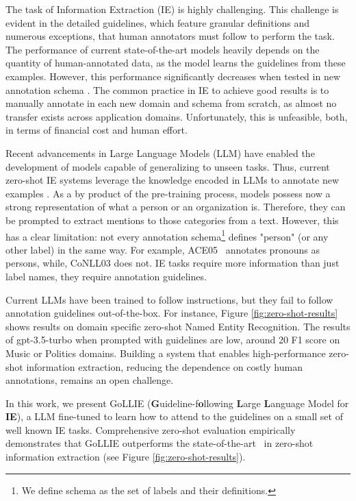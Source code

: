 \documentclass{article} \usepackage{iclr2024_conference,times}
\newcommand{\GoLLIE}{\scalerel*{\texttt{[image: logo/GoLLIE.pdf]}}{\textrm{\textbigcircle}} }
\begin{document}
The task of Information Extraction (IE) is highly challenging. This challenge is evident in the detailed guidelines, which feature granular definitions and numerous exceptions, that human annotators must follow to perform the task. The performance of current state-of-the-art models heavily depends on the quantity of human-annotated data, as the model learns the guidelines from these examples. However, this performance significantly decreases when tested in new annotation schema \citep{DBLP:conf/aaai/Liu0YDJCMF21}. The common practice in IE to achieve good results is to manually annotate in each new domain and schema from scratch, as almost no transfer exists across application domains. Unfortunately, this is unfeasible, both, in terms of financial cost and human effort.


Recent advancements in Large Language Models (LLM) \citep{10.1145/3605943} have enabled the development of models capable of generalizing to unseen tasks. Thus, current zero-shot IE systems leverage the knowledge encoded in LLMs to annotate new examples \citep{sainz-etal-2022-textual,DBLP:journals/corr/abs-2304-08085}. As a by product of the pre-training process, models possess now a strong representation of what a person or an organization is. Therefore, they can be prompted to extract mentions to those categories from a text. However, this has a clear limitation: not every annotation schema\footnote{We define schema as the set of labels and their definitions.} defines "person" (or any other label) in the same way. For example, ACE05~\citep{ACE} annotates pronouns as persons, while, CoNLL03 \citep{tjong-kim-sang-de-meulder-2003-introduction} does not. IE tasks require more information than just label names, they require annotation guidelines. 

Current LLMs have been trained to follow instructions, but they fail to follow annotation guidelines out-of-the-box. 
For instance, Figure \ref{fig:zero-shot-results} shows results on domain specific zero-shot Named Entity Recognition. The results of gpt-3.5-turbo when prompted with guidelines  \citep{ashok2023promptner} are low, around 20 F1 score on Music or Politics domains. Building a system that enables high-performance zero-shot information extraction, reducing the dependence on costly human annotations, remains an open challenge.  

In this work, we present \GoLLIE GoLLIE  (\textbf{G}uideline-f\textbf{o}llowing \textbf{L}arge \textbf{L}anguage Model for \textbf{IE}), a LLM fine-tuned to learn how to attend to the guidelines on a small set of well known IE tasks. Comprehensive zero-shot evaluation empirically demonstrates that GoLLIE outperforms the state-of-the-art~\citep{DBLP:journals/corr/abs-2304-08085}  in zero-shot information extraction (see Figure \ref{fig:zero-shot-results}). 
\end{document}
